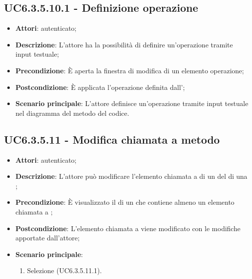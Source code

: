 \subsection{UC6.3.5.10.1 - Definizione operazione}
\label{ssec:UC6.3.5.10.1}
\begin{itemize}
\item \textbf{Attori}:  autenticato;
\item \textbf{Descrizione}: L'attore ha la possibilità di definire un'operazione tramite input testuale;
\item \textbf{Precondizione}: È aperta la finestra di modifica di un elemento operazione;
\item \textbf{Postcondizione}: È applicata l'operazione definita dall';
\item \textbf{Scenario principale}: L'attore definisce un'operazione tramite input testuale nel diagramma del metodo del codice.
\end{itemize}
\subsection{UC6.3.5.11 - Modifica chiamata a metodo}
\label{ssec:UC6.3.5.11}
\begin{itemize}
\item \textbf{Attori}:  autenticato;
\item \textbf{Descrizione}: L'attore può modificare l'elemento chiamata a  di un  del  di una ;
\item \textbf{Precondizione}: È visualizzato il  di un  che contiene almeno un elemento chiamata a ;
\item \textbf{Postcondizione}: L'elemento chiamata a  viene modificato con le modifiche apportate dall'attore;
\item \textbf{Scenario principale}: \begin{enumerate}\item Selezione  (UC6.3.5.11.1).
 \end{enumerate}
\end{itemize}
